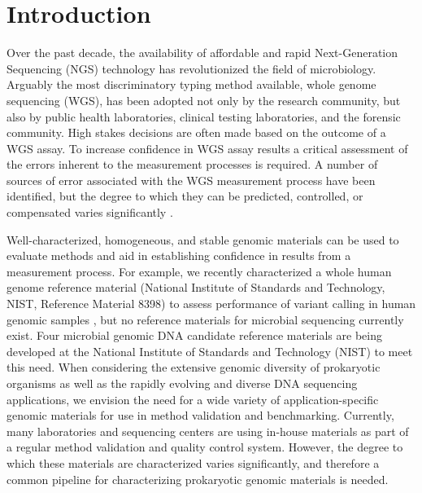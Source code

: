 \documentclass[smallextended]{svjour3}\usepackage[]{graphicx}\usepackage[]{color}
\begin{document}
\section{Introduction}
\label{intro}
Over the past decade, the availability of affordable and rapid Next-Generation Sequencing (NGS) technology has revolutionized the field of microbiology. Arguably the most discriminatory typing method available, whole genome sequencing (WGS), has been adopted not only by the research community, but also by public health laboratories, clinical testing laboratories, and the forensic community. High stakes decisions are often made based on the outcome of a WGS assay. To increase confidence in WGS assay results a critical assessment of the errors inherent to the measurement processes is required. A number of sources of error associated with the WGS measurement process have been identified, but the degree to which they can be predicted, controlled, or compensated varies significantly \cite{Olson2015}. 

Well-characterized, homogeneous, and stable genomic materials can be used to evaluate methods and aid in establishing confidence in results from a measurement process. For example, we recently characterized a whole human genome reference material (National Institute of Standards and Technology, NIST, Reference Material 8398) to assess performance of variant calling in human genomic samples \cite{Zook2014}, but no reference materials for microbial sequencing currently exist. Four microbial genomic DNA candidate reference materials are being developed at the National Institute of Standards and Technology (NIST) to meet this need. When considering the extensive genomic diversity of prokaryotic organisms as well as the rapidly evolving and diverse DNA sequencing applications, we envision the need for a wide variety of application-specific genomic materials for use in method validation and benchmarking. Currently, many laboratories and sequencing centers are using in-house materials as part of a regular method validation and quality control system. However, the degree to which these materials are characterized varies significantly, and therefore a common pipeline for characterizing prokaryotic genomic materials is needed.
\end{document}
